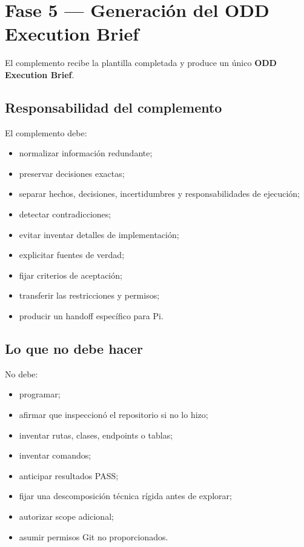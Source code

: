 \documentclass[11pt,a4paper]{article}
\begin{document}
\section{Fase 5 — Generación del ODD Execution Brief}

El complemento recibe la plantilla completada y produce un único \textbf{ODD Execution Brief}.

\subsection{Responsabilidad del complemento}

El complemento debe:

\begin{itemize}
    \item normalizar información redundante;
    \item preservar decisiones exactas;
    \item separar hechos, decisiones, incertidumbres y responsabilidades de ejecución;
    \item detectar contradicciones;
    \item evitar inventar detalles de implementación;
    \item explicitar fuentes de verdad;
    \item fijar criterios de aceptación;
    \item transferir las restricciones y permisos;
    \item producir un handoff específico para Pi.
\end{itemize}

\subsection{Lo que no debe hacer}

No debe:

\begin{itemize}
    \item programar;
    \item afirmar que inspeccionó el repositorio si no lo hizo;
    \item inventar rutas, clases, endpoints o tablas;
    \item inventar comandos;
    \item anticipar resultados PASS;
    \item fijar una descomposición técnica rígida antes de explorar;
    \item autorizar scope adicional;
    \item asumir permisos Git no proporcionados.
\end{itemize}
\end{document}
